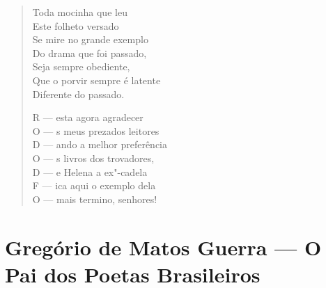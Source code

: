 \begin{verse}
Toda mocinha que leu \\
Este folheto versado \\
Se mire no grande exemplo \\
Do drama que foi passado, \\
Seja sempre obediente, \\
Que o porvir sempre é latente \\
Diferente do passado. 
\pagebreak

R --- esta agora agradecer \\
O --- s meus prezados leitores \\
D --- ando a melhor preferência \\
O --- s livros dos trovadores, \\
D --- e Helena a ex"-cadela \\
F --- ica aqui o exemplo dela \\
O --- mais termino, senhores! 
\end{verse}

\chapter{Gregório de Matos Guerra --- O Pai dos Poetas Brasileiros }

